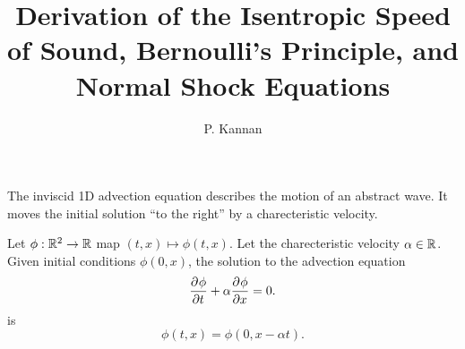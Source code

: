 \documentclass{doc}
\title{Derivation of the Isentropic Speed of Sound, Bernoulli's Principle, and Normal Shock Equations}
\author{P. Kannan}
\begin{document}
\begin{rk}
The inviscid 1D advection equation describes the motion of an
abstract wave.  It moves the initial solution ``to the right'' by
a charecteristic velocity.
\end{rk}

\begin{thm}
Let $\phi:\mathbb{R}^2\to \mathbb{R}$ map $(t,x)\mapsto \phi(t,x)$.
Let the charecteristic velocity $\alpha \in \mathbb{R}$.
Given initial conditions $\phi(0,x)$, the solution to the advection
equation
\begin{equation}
    \dfrac{\partial^{} {\phi}}{\partial {t}^{} } + \alpha \dfrac{\partial^{} {\phi}}{\partial {x}^{} } = 0.
\end{equation}
is
\begin{equation}
    \phi(t,x) = \phi(0,x-\alpha t).
\end{equation}
\end{thm}
\end{document}
